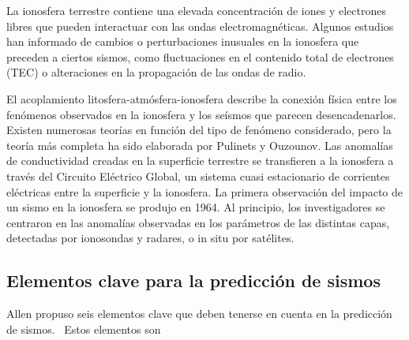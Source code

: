 La ionosfera terrestre contiene una elevada concentración de iones y electrones libres que pueden interactuar con las ondas electromagnéticas. Algunos estudios han informado de cambios o perturbaciones inusuales en la ionosfera que preceden a ciertos sismos, como fluctuaciones en el contenido total de electrones (TEC) o alteraciones en la propagación de las ondas de radio.

El acoplamiento litosfera-atmósfera-ionosfera describe la conexión física entre los fenómenos observados en la ionosfera y los seísmos que parecen desencadenarlos. Existen numerosas teorías en función del tipo de fenómeno considerado, pero la teoría más completa ha sido elaborada por Pulinets y Ouzounov. Las anomalías de conductividad creadas en la superficie terrestre se transfieren a la ionosfera a través del Circuito Eléctrico Global, un sistema cuasi estacionario de corrientes eléctricas entre la superficie y la ionosfera. La primera observación del impacto de un sismo en la ionosfera se produjo en 1964. Al principio, los investigadores se centraron en las anomalías observadas en los parámetros de las distintas capas, detectadas por ionosondas y radares, o in situ por satélites.
\subsection{Elementos clave para la predicción de sismos }
Allen propuso seis elementos clave que deben tenerse en cuenta en la predicción de sismos.~\cite{Bhardwaj2021} Estos elementos son 

